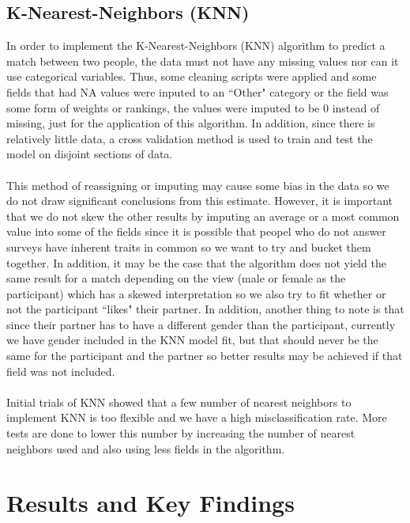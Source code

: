 \documentclass{article}
\begin{document}
\subsection{K-Nearest-Neighbors (KNN)}
In order to implement the K-Nearest-Neighbors (KNN) algorithm to predict a match between two people, the data must not have any missing values nor can it use categorical variables.  Thus, some cleaning scripts were applied and some fields that had NA values were inputed to an ``Other" category or the field was some form of weights or rankings, the values were imputed to be 0 instead of missing, just for the application of this algorithm.  In addition, since there is relatively little data, a cross validation method is used to train and test the model on disjoint sections of data.\\
\null\\
This method of reassigning or imputing may cause some bias in the data so we do not draw significant conclusions from this estimate.  However, it is important that we do not skew the other results by imputing an average or a most common value into some of the fields since it is possible that peopel who do not answer surveys have inherent traits in common so we want to try and bucket them together.  In addition, it may be the case that the algorithm does not yield the same result for a match depending on the view (male or female as the participant) which has a skewed interpretation so we also try to fit whether or not the participant ``likes" their partner.  In addition, another thing to note is that since their partner has to have a different gender than the participant, currently we have gender included in the KNN model fit, but that should never be the same for the participant and the partner so better results may be achieved if that field was not included.\\
\null\\
Initial trials of KNN showed that a few number of nearest neighbors to implement KNN is too flexible and we have a high misclassification rate.  More tests are done to lower this number by increasing the number of nearest neighbors used and also using less fields in the algorithm.
%
\section{Results and Key Findings}
\end{document}
